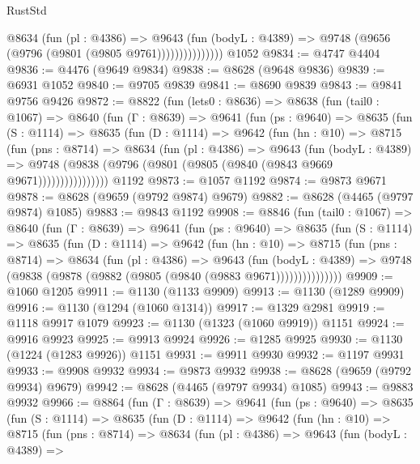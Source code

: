 \begin{lexlean}{RustStd}
\begin{coremodule}
                    @8634
                      (fun (pl : @4386) =>
                      @9643
                        (fun (bodyL : @4389) =>
                        @9748 (@9656 (@9796 (@9801 (@9805 @9761)))))))))))))))
    @1052
@9834 := @4747 @4404
@9836 := @4476 (@9649 @9834)
@9838 := @8628 (@9648 @9836)
@9839 := @6931 @1052
@9840 := @9705 @9839
@9841 := @8690 @9839
@9843 := @9841 @9756 @9426
@9872 := @8822
    (fun (lets0 : @8636) =>
    @8638
      (fun (tail0 : @1067) =>
      @8640
        (fun (Γ : @8639) =>
        @9641
          (fun (ps : @9640) =>
          @8635
            (fun (S : @1114) =>
            @8635
              (fun (D : @1114) =>
              @9642
                (fun (hn : @10) =>
                @8715
                  (fun (pns : @8714) =>
                  @8634
                    (fun (pl : @4386) =>
                    @9643
                      (fun (bodyL : @4389) =>
                      @9748 (@9838 (@9796 (@9801 (@9805 (@9840 (@9843 @9669 @9671))))))))))))))))
    @1192
@9873 := @1057 @1192
@9874 := @9873 @9671
@9878 := @8628 (@9659 (@9792 @9874) @9679)
@9882 := @8628 (@4465 (@9797 @9874) @1085)
@9883 := @9843 @1192
@9908 := @8846
    (fun (tail0 : @1067) =>
    @8640
      (fun (Γ : @8639) =>
      @9641
        (fun (ps : @9640) =>
        @8635
          (fun (S : @1114) =>
          @8635
            (fun (D : @1114) =>
            @9642
              (fun (hn : @10) =>
              @8715
                (fun (pns : @8714) =>
                @8634
                  (fun (pl : @4386) =>
                  @9643
                    (fun (bodyL : @4389) =>
                    @9748 (@9838 (@9878 (@9882 (@9805 (@9840 (@9883 @9671)))))))))))))))
@9909 := @1060 @1205
@9911 := @1130 (@1133 @9909)
@9913 := @1130 (@1289 @9909)
@9916 := @1130 (@1294 (@1060 @1314))
@9917 := @1329 @2981
@9919 := @1118 @9917 @1079
@9923 := @1130 (@1323 (@1060 @9919)) @1151
@9924 := @9916 @9923
@9925 := @9913 @9924
@9926 := @1285 @9925
@9930 := @1130 (@1224 (@1283 @9926)) @1151
@9931 := @9911 @9930
@9932 := @1197 @9931
@9933 := @9908 @9932
@9934 := @9873 @9932
@9938 := @8628 (@9659 (@9792 @9934) @9679)
@9942 := @8628 (@4465 (@9797 @9934) @1085)
@9943 := @9883 @9932
@9966 := @8864
    (fun (Γ : @8639) =>
    @9641
      (fun (ps : @9640) =>
      @8635
        (fun (S : @1114) =>
        @8635
          (fun (D : @1114) =>
          @9642
            (fun (hn : @10) =>
            @8715
              (fun (pns : @8714) =>
              @8634
                (fun (pl : @4386) =>
                @9643
                  (fun (bodyL : @4389) =>

\end{coremodule}
\end{lexlean}
